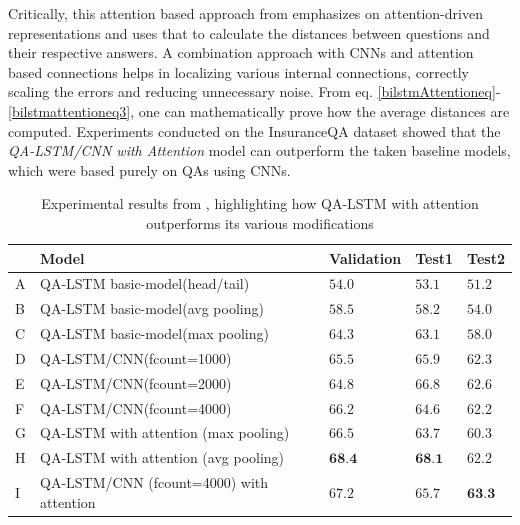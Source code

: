 \documentclass[a4paper,12pt]{report}
\begin{document}
            Critically, this attention based approach from \citep{lstmhaighextractive} emphasizes on attention-driven representations and uses that to calculate the distances between questions and their respective answers. A combination approach with CNNs and attention based connections helps in localizing various internal connections, correctly scaling the errors and reducing unnecessary noise. From eq. \ref{bilstmAttentioneq}-\ref{bilstmattentioneq3}, \citep{lstmhaighextractive} one can mathematically prove how the average distances are computed.
            Experiments conducted on the InsuranceQA dataset showed that the \textit{QA-LSTM/CNN with Attention} model can outperform the taken baseline models, which were based purely on QAs using CNNs.
            \begin{table}
                \begin{tabular}{|l|llll|}
                    \hline & Model & Validation & Test1 & Test2 \\
                    \hline A & QA-LSTM basic-model(head/tail) & $54.0$ & $53.1$ & $51.2$ \\
                    B & QA-LSTM basic-model(avg pooling) & $58.5$ & $58.2$ & $54.0$ \\
                    C & QA-LSTM basic-model(max pooling) & $64.3$ & $63.1$ & $58.0$ \\
                    \hline D & QA-LSTM/CNN(fcount=1000) & $65.5$ & $65.9$ & $62.3$ \\
                    E & QA-LSTM/CNN(fcount=2000) & $64.8$ & $66.8$ & $62.6$ \\
                    F & QA-LSTM/CNN(fcount=4000) & $66.2$ & $64.6$ & $62.2$ \\
                    \hline G & QA-LSTM with attention (max pooling) & $66.5$ & $63.7$ & $60.3$ \\
                    H & QA-LSTM with attention (avg pooling) & $\mathbf{6 8 . 4}$ & $\mathbf{6 8 . 1}$ & $62.2$ \\
                    I & QA-LSTM/CNN (fcount=4000) with attention & $67.2$ & $65.7$ & $\mathbf{6 3 . 3}$ \\
                    \hline
                \end{tabular}
                \caption{Experimental results from \citep{lstmhaighextractive}, highlighting how QA-LSTM with attention outperforms its various modifications}\label{lstmhaigexperiementresults}
            \end{table}
\end{document}
